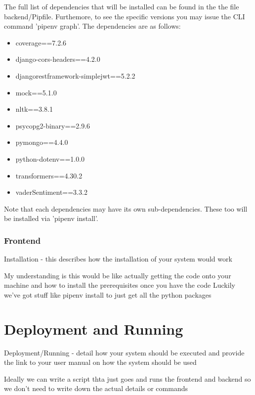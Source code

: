 \documentclass{article}
\begin{document}
The full list of dependencies that will be installed can be found in the the file backend/Pipfile. Furthemore, to see the specific versions you may issue the CLI command 'pipenv graph'. The dependencies are as follows:
\begin{itemize}
    \item coverage==7.2.6
    \item django-cors-headers==4.2.0
    \item djangorestframework-simplejwt==5.2.2
    \item mock==5.1.0
    \item nltk==3.8.1
    \item psycopg2-binary==2.9.6
    \item pymongo==4.4.0
    \item python-dotenv==1.0.0
    \item transformers==4.30.2
    \item vaderSentiment==3.3.2
\end{itemize}
Note that each dependencies may have its own sub-dependencies. These too will be installed via 'pipenv install'.

\subsubsection{Frontend}


Installation - this describes how the installation of your system would work

My understanding is this would be like actually getting the code onto your machine and how to install the prerequisites once you have the code
Luckily we've got stuff like pipenv install to just get all the python packages


\section{Deployment and Running}
Deployment/Running - detail how your system should be executed and provide the link to your user
manual on how the system should be used

Ideally we can write a script thta just goes and runs the frontend and backend so we don't need to write down the actual details or commands
\end{document}
